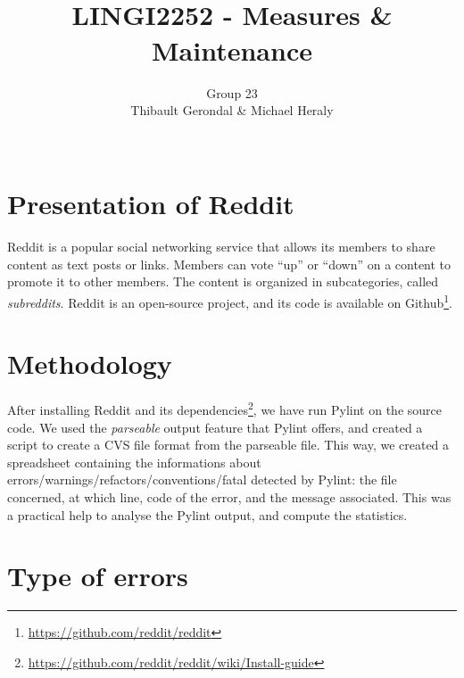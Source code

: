 \documentclass[11pt, a4paper]{article}
\title{\tbf{UCL} \\
	LINGI2252 - Measures \& Maintenance}
\author{Group 23 \\
		Thibault Gerondal \& Michael Heraly \\
		\\
		\tit{Teacher: Kim Mens}}
\newcommand{\tit}[1]{\textit{#1}}
\newcommand{\pyl}{\textsf{Pylint}}
\begin{document}
\maketitle


\section*{Presentation of Reddit}

Reddit is a popular social networking service that allows its members to share content as text posts or links.
Members can vote ``up'' or ``down'' on a content to promote it to other members.
The content is organized in subcategories, called \tit{subreddits}.
Reddit is an open-source project, and its code is available on Github\footnote{\url{https://github.com/reddit/reddit}}.


\section{Methodology}

After installing Reddit and its dependencies\footnote{\url{https://github.com/reddit/reddit/wiki/Install-guide}}, we have run \pyl{} on the source code.
We used the \tit{parseable} output feature that \pyl{} offers, and created a script to create a CVS file format from the parseable file.
This way, we created a spreadsheet containing the informations about errors/warnings/refactors/conventions/fatal detected by \pyl{}: the file concerned, at which line, code of the error, and the message associated. This was a practical help to analyse the \pyl{} output, and compute the statistics.

\newpage
\section{Type of errors}
\end{document}
